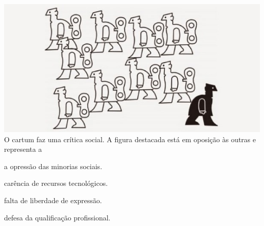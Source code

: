 \questao
\includegraphics[width=\columnwidth]{subareas/linguagens/image3.png}
O cartum faz uma crítica social. A figura destacada está em oposição às outras e representa a
\begin{alternativas}
  \item a opressão das minorias sociais.
  \item carência de recursos tecnológicos.
  \item falta de liberdade de expressão.
  \item defesa da qualificação profissional.
\end{alternativas}

